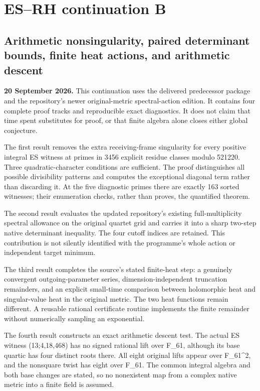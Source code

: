 \section{ES--RH continuation B}\label{esrh-continuation-b}

\subsection{Arithmetic nonsingularity, paired determinant bounds, finite
heat actions, and arithmetic
descent}\label{arithmetic-nonsingularity-paired-determinant-bounds-finite-heat-actions-and-arithmetic-descent}

\textbf{20 September 2026.} This continuation uses the delivered
predecessor package and the repository's newer original-metric
spectral-action edition. It contains four complete proof tracks and
reproducible exact diagnostics. It does not claim that time spent
substitutes for proof, or that finite algebra alone closes either global
conjecture.

The first result removes the extra receiving-frame singularity for every
positive integral ES witness at primes in 3456 explicit residue classes
modulo 521220. Three quadratic-character conditions are sufficient. The
proof distinguishes all possible divisibility patterns and computes the
exceptional diagonal term rather than discarding it. At the five
diagnostic primes there are exactly 163 sorted witnesses; their
enumeration checks, rather than proves, the quantified theorem.

The second result evaluates the updated repository's existing
full-multiplicity spectral allowance on the original quartet grid and
carries it into a sharp two-step native determinant inequality. The four
cutoff indices are retained. This contribution is not silently
identified with the programme's whole action or independent target
minimum.

The third result completes the source's stated finite-heat step: a
genuinely convergent outgoing-parameter series, dimension-independent
truncation remainders, and an explicit small-time comparison between
holomorphic heat and singular-value heat in the original metric. The two
heat functions remain different. A reusable rational certificate routine
implements the finite remainder without numerically sampling an
exponential.

The fourth result constructs an exact arithmetic descent test. The
actual ES witness (13;4,18,468) has no signed rational lift over F\_61,
although its base quartic has four distinct roots there. All eight
original lifts appear over F\_61\^{}2, and the nonsquare twist has eight
over F\_61. The common integral algebra and both base changes are
stated, so no nonexistent map from a complex native metric into a finite
field is assumed.

